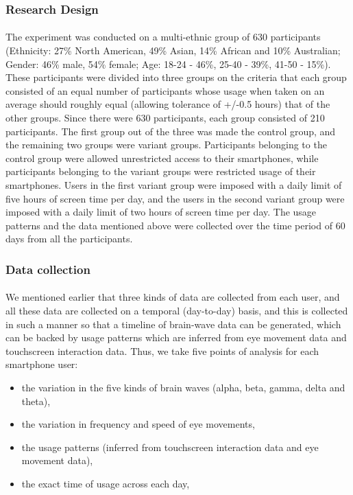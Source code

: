 \documentclass{article}
\begin{document}
\subsubsection{Research Design}

\paragraph{} The experiment was conducted on a multi-ethnic group of 630 participants (Ethnicity: 27\% North American, 49\% Asian, 14\% African and 10\% Australian; Gender: 46\% male, 54\% female; Age: 18-24 - 46\%, 25-40 - 39\%, 41-50 - 15\%). These participants were divided into three groups on the criteria that each group consisted of an equal number of participants whose usage when taken on an average should roughly equal (allowing tolerance of +/-0.5 hours) that of the other groups. Since there were 630 participants, each group consisted of 210 participants. The first group out of the three was made the control group, and the remaining two groups were variant groups. Participants belonging to the control group were allowed unrestricted access to their smartphones, while participants belonging to the variant groups were restricted usage of their smartphones. Users in the first variant group were imposed with a daily limit of five hours of screen time per day, and the users in the second variant group were imposed with a daily limit of two hours of screen time per day. The usage patterns and the data mentioned above were collected over the time period of 60 days from all the participants.

\subsubsection{Data collection}

\paragraph{} We mentioned earlier that three kinds of data are collected from each user, and all these data are collected on a temporal (day-to-day) basis, and this is collected in such a manner so that a timeline of brain-wave data can be generated, which can be backed by usage patterns which are inferred from eye movement data and touchscreen interaction data. Thus, we take five points of analysis for each smartphone user:

\begin{itemize}
    \item the variation in the five kinds of brain waves (alpha, beta, gamma, delta and theta),
    \item the variation in frequency and speed of eye movements,
    \item the usage patterns (inferred from touchscreen interaction data and eye movement data),
    \item the exact time of usage across each day,
\end{itemize}
\end{document}
